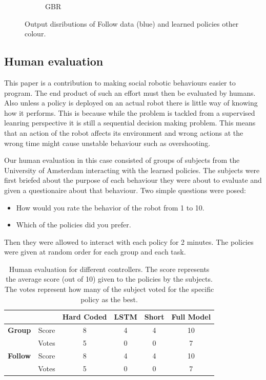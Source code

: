 \documentclass[letterpaper, 10 pt, conference]{ieeeconf}
\begin{document}
\begin{figure}[tbh]
\begin{subfigure}[b]{0.45\columnwidth}
    \caption{GBR}
       \label{fig:robot}
  \end{subfigure} 
  \caption{Output disributions of Follow data (blue) and learned policies other colour.}

    \vspace{-2mm}
  \label{fig:data_robot}
  \end{figure}


\subsection{Human evaluation}
This paper is a contribution to making social robotic behaviours easier to program. The end product of such an effort must then be evaluated by humans. Also unless a policy is deployed on an actual robot there is little way of knowing how it performs. This is because while the problem is tackled from a supervised leanring perspective it is still a sequential decision making problem. This means that an action of the robot affects its environment and wrong actions at the wrong time might cause unstable behaviour such as overshooting. 

Our human evaluation in this case consisted of groups of subjects from the University of Amsterdam interacting with the learned policies. The subjects were first briefed about the purpose of each behaviour they were about to evaluate and given a questionaire about that behaviour. Two simple questions were posed:
\begin{itemize}
	\item How would you rate the behavior of the robot from 1 to 10.
	\item Which of the policies did you prefer.
\end{itemize}
Then they were allowed to interact with each policy for 2 minutes. The policies were given at random order for each group and each task. 

\begin{table}[]
\centering
\caption{Human evaluation for different controllers. The score represents the average score (out of 10) given to the policies by the subjects. The votes represent how many of the subject voted for the specific policy as the best.}
\label{my-label}
\begin{tabular}{|c|c|c|c|c|c|}
\hline
                &       & \textbf{Hard Coded} & \textbf{LSTM} & \textbf{Short} & \textbf{Full Model} \\ \hline
\textbf{Group}  & Score & 8                   & 4             & 4              & 10                  \\ \hline
                & Votes & 5                   & 0             & 0              & 7                   \\ \hline
\textbf{Follow} & Score & 8                   & 4             & 4              & 10                  \\ \hline
                & Votes & 5                   & 0             & 0              & 7                   \\ \hline
\end{tabular}
\end{table}
\end{document}
